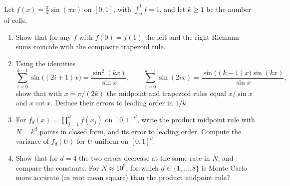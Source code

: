 \begin{exercise}\label{ex:mc-sine}
\medium Let $f(x)=\frac\pi2\sin(\pi x)$ on $[0,1]$, with $\int_0^1f=1$, and let $k\ge1$ be the
number of cells.
\begin{enumerate}[label=(\alph*)]
  \item Show that for any $f$ with $f(0)=f(1)$ the left and the right Riemann sums coincide
    with the composite trapezoid rule.
  \item Using the identities
    \[
      \sum_{i=0}^{k-1}\sin\big((2i+1)x\big)=\frac{\sin^2(kx)}{\sin x},\qquad
      \sum_{i=0}^{k-1}\sin(2ix)=\frac{\sin\big((k-1)x\big)\sin(kx)}{\sin x},
    \]
    show that with $x=\pi/(2k)$ the midpoint and trapezoid rules equal $x/\sin x$ and
    $x\cot x$. Deduce their errors to leading order in $1/k$.
  \item For $f_d(x)=\prod_{j=1}^df(x_j)$ on $[0,1]^d$, write the product midpoint rule with
    $N=k^d$ points in closed form, and its error to leading order. Compute the variance of
    $f_d(U)$ for $U$ uniform on $[0,1]^d$.
  \item Show that for $d=4$ the two errors decrease at the same rate in $N$, and compare
    the constants. For $N\approx10^9$, for which $d\in\{1,\dots,8\}$ is Monte Carlo more
    accurate (in root mean square) than the product midpoint rule?
\end{enumerate}
\end{exercise}
